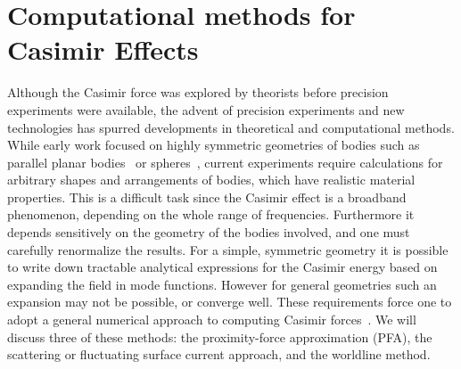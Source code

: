     



\section{Computational methods for Casimir Effects}
\label{sec:numerical_review}

Although the Casimir force was explored by theorists before precision experiments were available,
the advent of precision experiments and new technologies has spurred developments in 
theoretical and computational methods.
While early work focused on highly symmetric geometries 
of bodies such as parallel planar bodies~\cite{Casimir1948} or spheres~\cite{Boyer1968}, 
current experiments require calculations for arbitrary shapes and arrangements of bodies, 
which have realistic material properties.  
This is a difficult task since the Casimir effect is a broadband phenomenon, depending on the whole 
range of frequencies.  Furthermore it depends sensitively on the geometry of the bodies involved, 
and one must carefully renormalize the results.  
For a simple, symmetric geometry it is possible to write down tractable analytical expressions for
the Casimir energy based on expanding the field in mode functions.  However for general geometries 
such an expansion may not be possible, or converge well.
These requirements force one to adopt a general numerical approach to computing Casimir forces~\cite{Johnson2011}.
We will discuss three of these methods: the proximity-force approximation (PFA), the scattering
or fluctuating surface current approach, and the worldline method.

